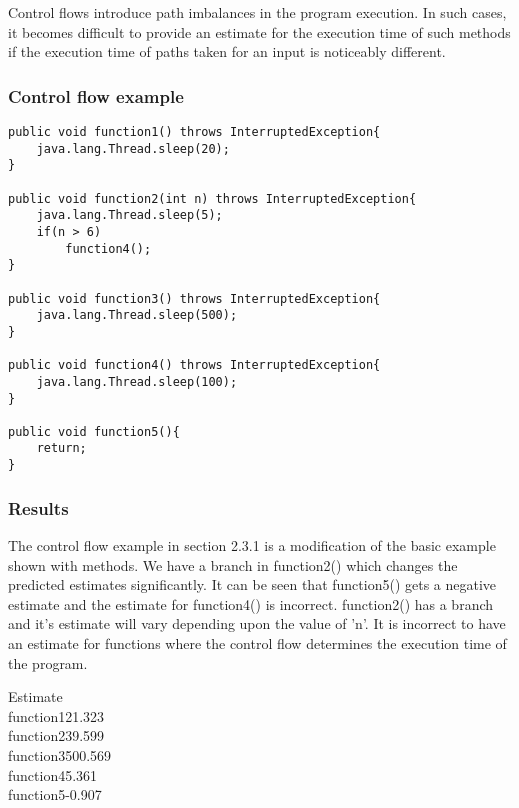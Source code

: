Control flows introduce path imbalances in the program execution. In such cases, it becomes difficult to provide an estimate for the execution time of such methods if the  execution time of paths taken for an input is noticeably different.

\subsubsection{Control flow example}
\singlespacing
\begin{lstlisting}
public void function1() throws InterruptedException{
	java.lang.Thread.sleep(20);
}
	
public void function2(int n) throws InterruptedException{
	java.lang.Thread.sleep(5);
	if(n > 6)
		function4();	
}
	
public void function3() throws InterruptedException{
	java.lang.Thread.sleep(500);
}
	
public void function4() throws InterruptedException{	
	java.lang.Thread.sleep(100);
}
	
public void function5(){
	return;
}
\end{lstlisting}
\doublespacing

\subsubsection{Results}
The control flow example in section 2.3.1 is a modification of the basic example shown with methods. We have a branch in function2() which changes the predicted estimates significantly. It can be seen that function5() gets a negative estimate and the estimate for function4() is incorrect. function2() has a branch and it's estimate will vary depending upon the value of 'n'. It is incorrect to have an estimate for functions where the control flow determines the execution time of the program.\newline


\hspace{6em}Estimate\\
function1\hspace{2em}21.323\\
function2\hspace{2em}39.599\\
function3\hspace{2em}500.569\\
function4\hspace{2em}5.361\\
function5\hspace{2em}-0.907\\

